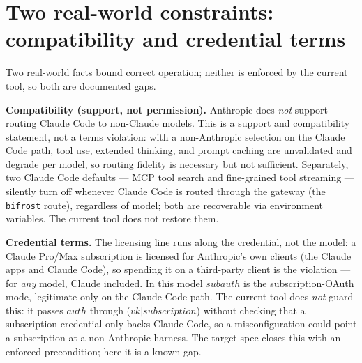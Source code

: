\documentclass{article}
\begin{document}
\section{Two real-world constraints: compatibility and credential terms}

Two real-world facts bound correct operation; neither is enforced by the
current tool, so both are documented gaps.

\textbf{Compatibility (support, not permission).} Anthropic does \emph{not}
support routing Claude Code to non-Claude models. This is a support and
compatibility statement, not a terms violation: with a non-Anthropic selection
on the Claude Code path, tool use, extended thinking, and prompt caching are
unvalidated and degrade per model, so routing fidelity is necessary but not
sufficient. Separately, two Claude Code defaults --- MCP tool search and
fine-grained tool streaming --- silently turn off whenever Claude Code is routed
through the gateway (the \texttt{bifrost} route), regardless of model; both are
recoverable via environment variables. The current tool does not restore them.

\textbf{Credential terms.} The licensing line runs along the credential, not the
model: a Claude Pro/Max subscription is licensed for Anthropic's own clients
(the Claude apps and Claude Code), so spending it on a third-party client is the
violation --- for \emph{any} model, Claude included. In this model $subauth$ is
the subscription-OAuth mode, legitimate only on the Claude Code path. The
current tool does \emph{not} guard this: it passes $auth$ through
($vk|subscription$) without checking that a subscription credential only backs
Claude Code, so a misconfiguration could point a subscription at a non-Anthropic
harness. The target spec closes this with an enforced precondition; here it is a
known gap.
\end{document}
